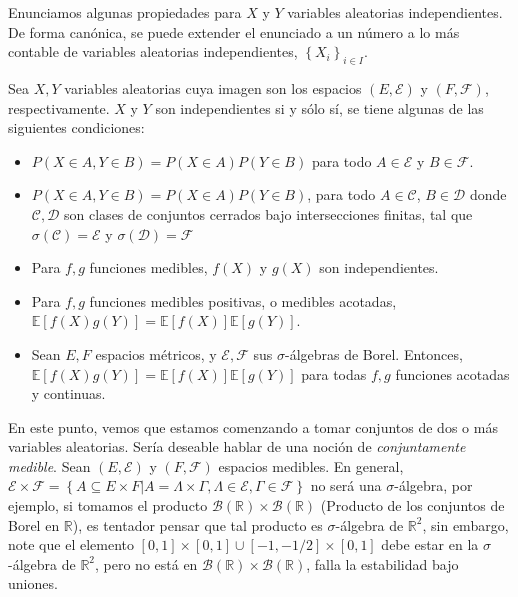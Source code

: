 Enunciamos algunas propiedades para $X$ y $Y$ variables aleatorias independientes. De forma canónica, se puede extender el enunciado a un número a lo más contable de variables aleatorias independientes, $\left\{ X_i \right\}_{i \in I}$.

\begin{theorem}
	Sea $X, Y$ variables aleatorias cuya imagen son los espacios $(E, \mathcal{E})$ y $(F, \mathcal{F})$, respectivamente. $X$ y $Y$ son independientes si y sólo sí, se tiene algunas de las siguientes condiciones:

	\begin{itemize}
		\item $P(X \in A, Y \in B) = P(X \in A)P(Y \in B)$ para todo $A \in \mathcal{E}$ y $B \in \mathcal{F}$.
		\item $P(X \in A, Y \in B) = P(X \in A)P(Y \in B)$, para todo $A \in \mathcal{C}$, $B \in \mathcal{D}$ donde $\mathcal{C}, \mathcal{D}$ son clases de conjuntos cerrados bajo intersecciones finitas, tal que $\sigma(\mathcal{C}) = \mathcal{E}$ y $\sigma( \mathcal{D} ) = \mathcal{F}$
		\item Para $f, g$ funciones medibles, $f(X)$ y $g(X)$ son independientes.
		\item Para $f, g$ funciones medibles positivas, o medibles acotadas, $\mathbb{E}[ f(X)g(Y) ] = \mathbb{E}[f(X)] \mathbb{E}[g(Y)]$.
		\item Sean $E, F$ espacios métricos, y $\mathcal{E}, \mathcal{F}$ sus $\sigma$-álgebras de Borel. Entonces, $\mathbb{E}[ f(X)g(Y) ] = \mathbb{E}[f(X)] \mathbb{E}[g(Y)]$ para todas $f, g$ funciones acotadas y continuas.
	\end{itemize}

\end{theorem}

En este punto, vemos que estamos comenzando a tomar conjuntos de dos o más variables aleatorias. Sería deseable hablar de una noción de \textit{conjuntamente medible}. Sean $(E, \mathcal{E})$ y $(F, \mathcal{F})$ espacios medibles. En general, $\mathcal{E} \times \mathcal{F} = \left\{ A \subseteq E \times F | A = \Lambda \times \Gamma, \Lambda \in \mathcal{E}, \Gamma \in \mathcal{F} \right\}$ no será una $\sigma$-álgebra, por ejemplo, si tomamos el producto $\mathcal{B}(\mathbb{R}) \times \mathcal{B}(\mathbb{R})$ (Producto de los conjuntos de Borel en $\mathbb{R}$), es tentador pensar que tal producto es $\sigma$-álgebra de $\mathbb{R}^2$, sin embargo, note que el elemento $[0, 1] \times [0,1] \cup [-1, -1/2] \times [0, 1]$ debe estar en la $\sigma$-álgebra de $\mathbb{R}^2$, pero no está en $\mathcal{B}(\mathbb{R}) \times \mathcal{B}(\mathbb{R})$, falla la estabilidad bajo uniones. \\

